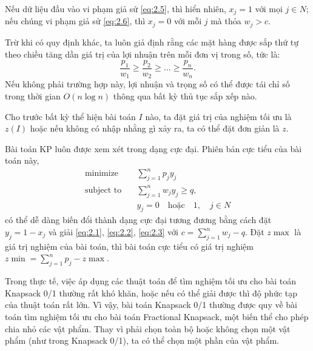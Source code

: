 Nếu dữ liệu đầu vào vi phạm giả sử \eqref{eq:2.5}, thì hiển nhiên, $x_j = 1$ với mọi $j \in N$; nếu chúng vi phạm giả sử \eqref{eq:2.6}, thì $x_j = 0$ với mỗi $j$ mà thỏa $w_j > c$.

Trừ khi có quy định khác, ta luôn giả định rằng các mặt hàng được sắp thứ tự theo chiều tăng dần giá trị của lợi nhuận trên mỗi đơn vị trong số, tức là:
\begin{equation}
    \label{eq:2.7}
    \frac{p_1}{w_1} \geq \frac{p_2}{w_2} \geq \dots \geq \frac{p_n}{w_n}.
\end{equation}
Nếu không phải trường hợp này, lợi nhuận và trọng số có thể được tái chỉ số trong thời gian $O(n\log n)$ thông qua bất kỳ thủ tục sắp xếp nào.

Cho trước bất kỳ thể hiện bài toán $I$ nào, ta đặt giá trị của nghiệm tối ưu là $z(I)$ hoặc nếu không có nhập nhằng gì xảy ra, ta có thể đặt đơn giản là $z$.

Bài toán KP luôn được xem xét trong dạng cực đại. Phiên bản cực tiểu của bài toán này,
\begin{align}
    \text{minimize}\quad&\sum_{j = 1}^np_jy_j \\
    \text{subject to}\quad & \sum_{j = 1}^nw_jy_j \geq q,\\
    & y_j = 0 \quad \text{hoặc} \quad 1,\quad j \in N
\end{align}
có thể dễ dàng biến đổi thành dạng cực đại tương đương bằng cách đặt $y_j =  1 - x_j$ và giải \eqref{eq:2.1}, \eqref{eq:2.2}, \eqref{eq:2.3} với $c = \sum_{j = 1}^nw_j - q$. Đặt $z\max$ là giá trị nghiệm của bài toán, thì bài toán cực tiểu có giá trị nghiệm $z\min = \sum_{j = 1}^np_j - z\max$.

Trong thực tế, việc áp dụng các thuật toán để tìm nghiệm tối ưu cho bài toán Knapsack 0/1 thường rất khó khăn, hoặc nếu có thể giải được thì độ phức tạp của thuật toán rất lớn. Vì vậy, bài toán Knapsack 0/1 thường được quy về bài toán tìm nghiệm tối ưu cho bài toán Fractional Knapsack, một biến thể cho phép chia nhỏ các vật phẩm. Thay vì phải chọn toàn bộ hoặc không chọn một vật phẩm (như trong Knapsack 0/1), ta có thể chọn một phần của vật phẩm.

